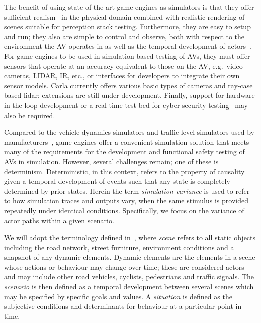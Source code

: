 \documentclass[letterpaper, 10 pt, journal, twoside]{IEEEtran}
\begin{document}
The benefit of using state-of-the-art game engines as simulators is that they offer sufficient realism~\cite{Koopman2018} in the physical domain combined with realistic rendering of scenes suitable for perception stack testing. 
%
Furthermore, they are easy to setup and run; they also are simple to control and observe, both with respect to the environment the AV operates in as well as the temporal development of actors~\cite{Ulbrich2015}. 
%
For game engines to be used in simulation-based testing of AVs, they must offer sensors that operate at an accuracy equivalent to those on the AV, e.g.\ video cameras, LIDAR, IR, etc., or interfaces for developers to integrate their own sensor models. Carla currently offers various basic types of cameras and ray-case based lidar; extensions are still under development. 
%
Finally, support for hardware-in-the-loop development or a real-time test-bed for cyber-security testing~\cite{Javaid2013} may also be required. 

Compared to the vehicle dynamics simulators and traffic-level simulators used by manufacturers~\cite{FrameworkAndChallenges}, game engines offer a convenient simulation solution that meets many of the requirements for the development and functional safety testing of AVs in simulation. However, several challenges remain; one of these is determinism.
%
Deterministic, in this context, refers to the property of causality given a temporal development of events such that any state is completely determined by prior states.
%
Herein the term \textit{simulation variance} is used to refer to how simulation traces and outputs vary, when the same stimulus is provided repeatedly under identical conditions. Specifically, we focus on the variance of actor paths within a given scenario. 

We will adopt the terminology defined in~\cite{Ulbrich2015}, where \textit{scene} refers to all static objects including the road network, street furniture, environment conditions and a snapshot of any dynamic elements. Dynamic elements are the elements in a scene whose actions or behaviour may change over time; these are considered actors and may include other road vehicles, cyclists, pedestrians and traffic signals. The \textit{scenario} is then defined as a temporal development between several scenes which may be specified by specific goals and values. A \textit{situation} is defined as the subjective conditions and determinants for behaviour at a particular point in time.
\end{document}
